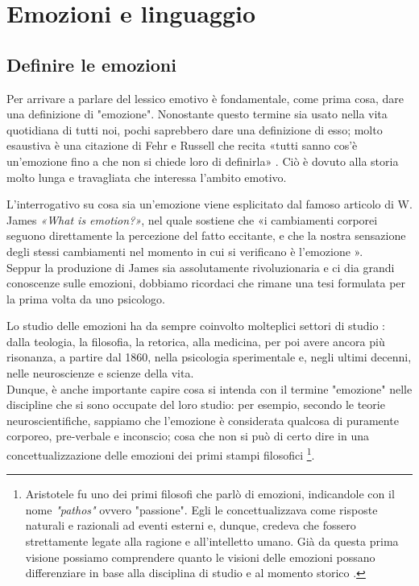 \chapter{Emozioni e linguaggio}
\section{Definire le emozioni}
Per arrivare a parlare del lessico emotivo è fondamentale, come prima cosa, dare una definizione di "emozione". 
Nonostante questo termine sia usato nella vita quotidiana di tutti noi, pochi saprebbero dare una definizione di esso; molto esaustiva è una citazione di Fehr e Russell che recita «tutti sanno cos'è un'emozione fino a che non si chiede loro di definirla» \parencite{russel_fehr}. Ciò è dovuto alla storia molto lunga e travagliata che interessa l'ambito emotivo.

L'interrogativo su cosa sia un'emozione viene esplicitato dal famoso articolo di W. James \textit{«What is emotion?»}, nel quale sostiene che «i cambiamenti corporei seguono direttamente la percezione del fatto eccitante, e che la nostra sensazione degli stessi cambiamenti nel momento in cui si verificano è l'emozione \parencite{james}».\\
Seppur la produzione di James sia assolutamente rivoluzionaria e ci dia grandi conoscenze sulle emozioni, dobbiamo ricordaci che rimane una tesi formulata per la prima volta da uno psicologo. 

Lo studio delle emozioni ha da sempre coinvolto molteplici settori di studio \parencite{storia_delle_emozioni}: dalla teologia, la filosofia, la retorica, alla medicina, per poi avere ancora più risonanza, a partire dal 1860, nella psicologia sperimentale e, negli ultimi decenni, nelle neuroscienze e scienze della vita.\\
Dunque, è anche importante capire cosa si intenda con il termine "emozione" nelle discipline che si sono occupate del loro studio: per esempio, secondo le teorie neuroscientifiche, sappiamo che l'emozione è considerata qualcosa di puramente corporeo, pre-verbale e inconscio; cosa che non si può di certo dire in una concettualizzazione delle emozioni dei primi stampi filosofici \footnote{Aristotele fu uno dei primi filosofi che parlò di emozioni, indicandole con il nome \textit{"pathos"} ovvero "passione". Egli le concettualizzava come risposte naturali e razionali ad eventi esterni e, dunque, credeva che fossero strettamente legate alla ragione e all'intelletto umano. Già da questa prima visione possiamo comprendere quanto le visioni delle emozioni possano differenziare in base alla disciplina di studio e al momento storico \parencite{aristotele}.}.

